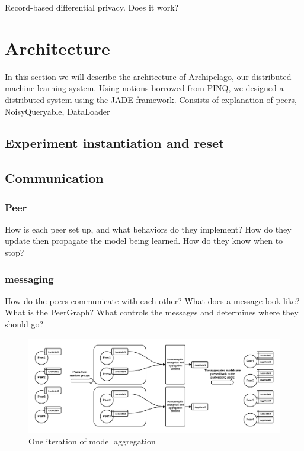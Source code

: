Record-based differential privacy. Does it work?




\section{Architecture}

In this section we will describe the architecture of Archipelago, our distributed machine learning system. 
Using notions borrowed from PINQ, we designed a distributed system using the JADE framework. Consists of explanation of peers, NoisyQueryable, DataLoader


\subsection{Experiment instantiation and reset}


\subsection{Communication}
\subsubsection{Peer}
How is each peer set up, and what behaviors do they implement? 
How do they update then propagate the model being learned.
How do they know when to stop?
\subsubsection{messaging}
How do the peers communicate with each other?
What does a message look like?
What is the PeerGraph?
What controls the messages and determines where they should go?
\begin{figure}[h!]
	\centering
	\includegraphics[width=\textwidth]{fig/peerModelCreation}
	\caption{One iteration of model aggregation}
	\label{fig:peerAggregationFigure}
\end{figure}



